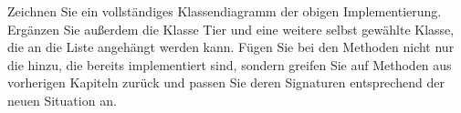 \documentclass{article}
\begin{document}
\begin{task}{4}
Zeichnen Sie ein vollständiges Klassendiagramm der obigen Implementierung. Ergänzen Sie außerdem die Klasse Tier und eine weitere selbst gewählte Klasse, die an die Liste angehängt werden kann. Fügen Sie bei den Methoden nicht nur die hinzu, die bereits implementiert sind, sondern greifen Sie auf Methoden aus vorherigen Kapiteln zurück und passen Sie deren Signaturen entsprechend der neuen Situation an. 
\end{task}
\end{document}

